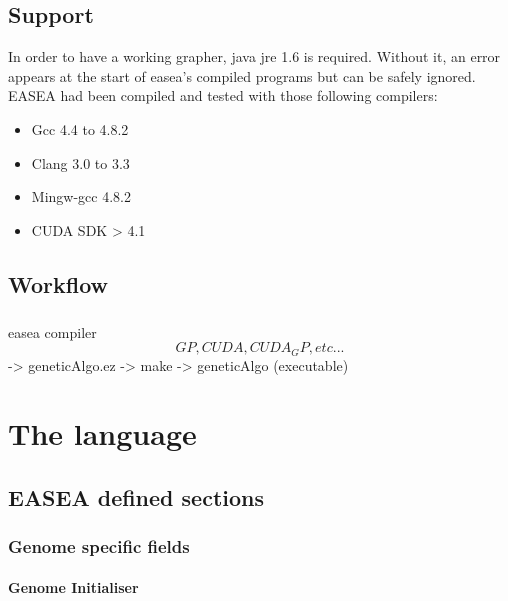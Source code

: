 \documentclass{book}
\begin{document}
\section{Support} %
\label{sec:Support}
In order to have a working grapher, java jre 1.6 is required. Without it, an error appears at the start of easea's compiled programs but can be safely ignored.
\\
EASEA had been compiled and tested with those following compilers:

    \begin{itemize}
      \item Gcc 4.4 to 4.8.2
      \item Clang 3.0 to 3.3
      \item Mingw-gcc 4.8.2
      \item CUDA SDK > 4.1
    \end{itemize}

\section{Workflow} %
\label{sec:Workflow}
\paragraph{} %
\label{par:}

easea compiler \[GP,CUDA,CUDA_GP, etc ...\]-> geneticAlgo.ez -> make -> geneticAlgo
(executable) 

\chapter{The language} %
\label{sec:the language}
 \section{EASEA defined sections} %
 \label{sub:EASEA defined sections}
 
\subsection{Genome specific fields}\label{genome-specific-fields}

\subsubsection{Genome Initialiser}\label{genome-initialiser}
\end{document}
